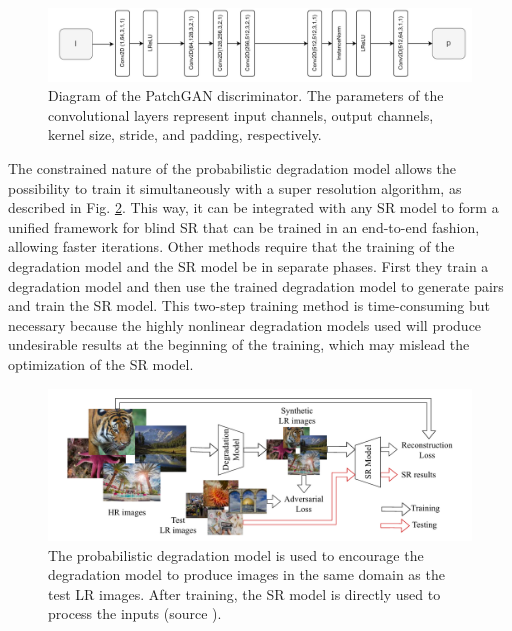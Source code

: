     \begin{figure}[H]
        \centering
        \includegraphics[width=\textwidth]{Includes/3-slim_patchGAN_architecture.pdf}
        \caption{Diagram of the PatchGAN discriminator.
                 The parameters of the convolutional layers represent input channels, output channels, kernel size, stride, and padding, respectively. }
        \label{fig:3-slim-patchgan-module}
    \end{figure}

    
    The constrained nature of the probabilistic degradation model allows the possibility to train it simultaneously with a super resolution algorithm, as described in Fig. \ref{fig:3-GAN-degradation-model}.      
    This way, it can be integrated with any SR model to form a unified framework for blind SR that can be trained in an end-to-end fashion, allowing faster iterations.
    Other methods \cite{fritsche2019frequency,wei2020unsupervised} require that the training of the degradation model and the SR model be in separate phases. First they train a degradation model and then use the trained degradation model to generate pairs and train the SR model.
    This two-step training method is time-consuming but necessary because the highly nonlinear degradation models used will produce undesirable results at the beginning of the training, which may mislead the optimization of the SR model.

    \begin{figure}[H]
        \centering
        \includegraphics[width=\textwidth]{Includes/3-GAN-degradation-model.png}
        \caption{The probabilistic degradation model is used to encourage the degradation model to produce images in the same domain as the test LR images.
                After training, the SR model is directly used to process the inputs (source \cite{luo2022learning}).}
        \label{fig:3-GAN-degradation-model}
    \end{figure}

